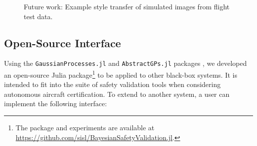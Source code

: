 \begin{figure}[t]
    \vspace*{-10mm}
    \centering
    \caption{Future work: Example style transfer of simulated images from flight test data.}
    \label{fig:rwd_style_transfer}
\end{figure}


\subsection{Open-Source Interface}
Using the \texttt{GaussianProcesses.jl} \cite{fairbrother2022gaussianprocesses} and \texttt{AbstractGPs.jl} packages \cite{widmann2023abstractgps}, we developed an open-source Julia package\footnote{The package and experiments are available at \url{https://github.com/sisl/BayesianSafetyValidation.jl}.} to be applied to other black-box systems. It is intended to fit into the suite of safety validation tools when considering autonomous aircraft certification.
To extend to another system, a user can implement the following interface:


